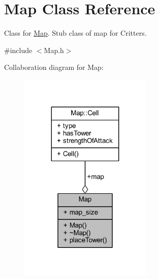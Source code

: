 \hypertarget{class_map}{\section{Map Class Reference}
\label{class_map}
}


Class for \hyperlink{class_map}{Map}. Stub class of map for Critters.  




{\ttfamily \#include $<$Map.\+h$>$}



Collaboration diagram for Map\+:
\nopagebreak
\begin{figure}[H]
\begin{center}
\leavevmode
\includegraphics[width=179pt]{class_map__coll__graph}
\end{center}
\end{figure}
